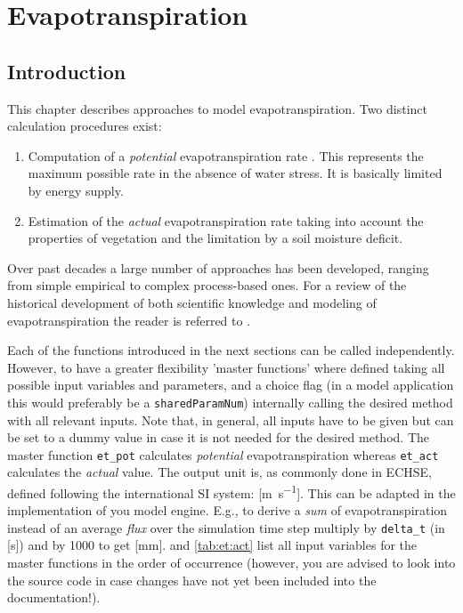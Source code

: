 \chapter{Evapotranspiration} \label{chap:et}
\renewcommand{\tabdir}{chapters/part_processes/evapotranspiration/tab}
\renewcommand{\figdir}{chapters/part_processes/evapotranspiration/fig}

\section{Introduction} \label{sec:et:intro}

This chapter describes approaches to model evapotranspiration. Two distinct calculation procedures exist:
\begin{enumerate}
  \item Computation of a \emph{potential} evapotranspiration rate \etPot. This represents the maximum possible rate in the absence of water stress. It is basically limited by energy supply.
  \item Estimation of the \emph{actual} evapotranspiration rate \etReal{} taking into account the properties of vegetation and the limitation by a soil moisture deficit.
\end{enumerate}

Over past decades a large number of approaches has been developed, ranging from simple empirical to complex process-based ones. For a review of the historical development of both scientific knowledge and modeling of evapotranspiration the reader is referred to \cite{Shuttleworth2007}.

Each of the functions introduced in the next sections can be called independently. However, to have a greater flexibility 'master functions' where defined taking all possible input variables and parameters, and a choice flag (in a model application this would preferably be a \verb!sharedParamNum!) internally calling the desired method with all relevant inputs. Note that, in general, all inputs have to be given but can be set to a dummy value in case it is not needed for the desired method. The master function \verb!et_pot! calculates \emph{potential} evapotranspiration whereas \verb!et_act! calculates the \emph{actual} value. The output unit is, as commonly done in ECHSE, defined following the international SI system: [\si{\metre\per\second}]. This can be adapted in the implementation of you model engine. E.g., to derive a \emph{sum} of evapotranspiration instead of an average \emph{flux} over the simulation time step multiply by \verb!delta_t! (in [\si{\second}]) and by \num{1000} to get [\si{\milli\metre}].  and \ref{tab:et:act} list all input variables for the master functions in the order of occurrence (however, you are advised to look into the source code in case changes have not yet been included into the documentation!).

